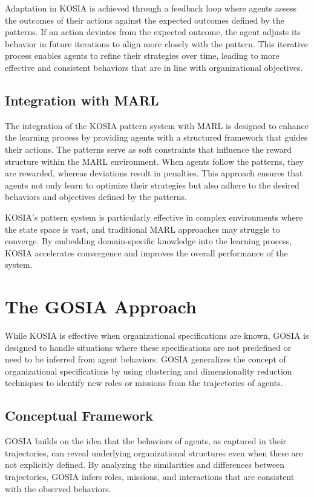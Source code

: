\documentclass[sn-mathphys-num]{sn-jnl}%
\theoremstyle{thmstyleone}%
\theoremstyle{thmstyletwo}%
\theoremstyle{thmstylethree}%
\begin{document}
Adaptation in KOSIA is achieved through a feedback loop where agents assess the outcomes of their actions against the expected outcomes defined by the patterns. If an action deviates from the expected outcome, the agent adjusts its behavior in future iterations to align more closely with the pattern. This iterative process enables agents to refine their strategies over time, leading to more effective and consistent behaviors that are in line with organizational objectives.

\subsection{Integration with MARL}
The integration of the KOSIA pattern system with MARL is designed to enhance the learning process by providing agents with a structured framework that guides their actions. The patterns serve as soft constraints that influence the reward structure within the MARL environment. When agents follow the patterns, they are rewarded, whereas deviations result in penalties. This approach ensures that agents not only learn to optimize their strategies but also adhere to the desired behaviors and objectives defined by the patterns.

KOSIA's pattern system is particularly effective in complex environments where the state space is vast, and traditional MARL approaches may struggle to converge. By embedding domain-specific knowledge into the learning process, KOSIA accelerates convergence and improves the overall performance of the system.




\section{The GOSIA Approach}
\label{sec:gosia}

While KOSIA is effective when organizational specifications are known, GOSIA is designed to handle situations where these specifications are not predefined or need to be inferred from agent behaviors. GOSIA generalizes the concept of organizational specifications by using clustering and dimensionality reduction techniques to identify new roles or missions from the trajectories of agents.

\subsection{Conceptual Framework}

GOSIA builds on the idea that the behaviors of agents, as captured in their trajectories, can reveal underlying organizational structures even when these are not explicitly defined. By analyzing the similarities and differences between trajectories, GOSIA infers roles, missions, and interactions that are consistent with the observed behaviors.
\end{document}
